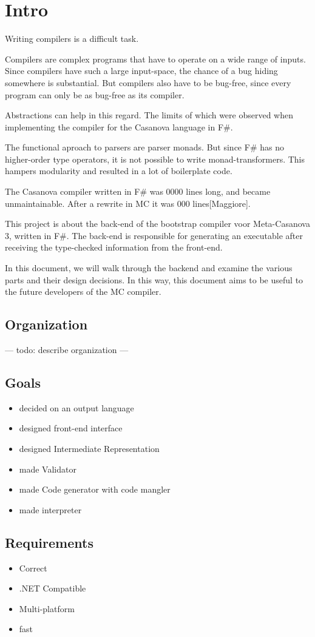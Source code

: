 \section{Intro}
Writing compilers is a difficult task.

Compilers are complex programs that have to operate on a wide range of inputs.
Since compilers have such a large input-space, the chance of a bug hiding somewhere is substantial. 
But compilers also have to be bug-free, since every program can only be as bug-free as its compiler.

Abstractions can help in this regard.
The limits of which were observed when implementing the compiler for the Casanova language in F\#.

The functional aproach to parsers are parser monads.
But since F\# has no higher-order type operators, it is not possible to write monad-transformers.
This hampers modularity and resulted in a lot of boilerplate code.

The Casanova compiler written in F\# was 0000 lines long, and became unmaintainable.
After a rewrite in MC it was 000 lines[Maggiore].

This project is about the back-end of the bootstrap compiler voor Meta-Casanova 3, written in F\#.
The back-end is responsible for generating an executable after receiving the type-checked information from the front-end.

In this document, we will walk through the backend and examine the various parts and their design decisions.
In this way, this document aims to be useful to the future developers of the MC compiler.

\subsection{Organization}
--- todo: describe organization ---

\subsection{Goals}

\begin{itemize}
    \item decided on an output language
    \item designed front-end interface
    \item designed Intermediate Representation
    \item made Validator
    \item made Code generator with code mangler
    \item made interpreter
\end{itemize}

\subsection{Requirements}
\begin{itemize}
    \item Correct
    \item .NET Compatible
    \item Multi-platform
    \item fast
\end{itemize}
